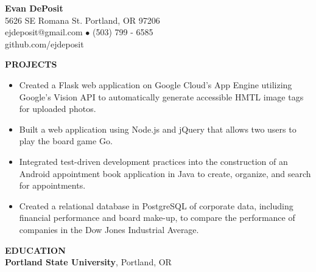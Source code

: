 \documentclass[11pt]{article}
\begin{document}
\thispagestyle{empty}
\begin{center}
\noindent \Large{\textbf{Evan DePosit}}\\
\large{5626 SE Romana St. Portland, OR 97206}\\
\large{ejdeposit@gmail.com $\bullet$ (503) 799 - 6585}\\
\large{github.com/ejdeposit}
\end{center}
\medskip

\noindent
\makebox[0pt][l]{\rule[-.2\baselineskip]{\linewidth}{.3mm}}%
\large{\textbf{PROJECTS}}
%
\begin{itemize}[leftmargin=*, itemsep=0pt, topsep=5pt]
	\item Created a Flask web application on Google Cloud’s App Engine utilizing Google’s Vision API to automatically generate accessible HMTL image tags for uploaded photos.
	\item Built a web application using Node.js and jQuery that allows two users to play the board game Go.
	\item Integrated test-driven development practices into the construction of an Android appointment book application in Java to create, organize, and search for appointments.
	\item Created a relational database in PostgreSQL of corporate data, including financial performance and board make-up, to compare the performance of companies in the Dow Jones Industrial Average.
\end{itemize}
\bigbreak \noindent
%
\makebox[0pt][l]{\rule[-.2\baselineskip]{\linewidth}{.3mm}}%
\large{\textbf{EDUCATION}} \smallskip \\
%
\textbf{Portland State University}, Portland, OR\\
\end{document}

